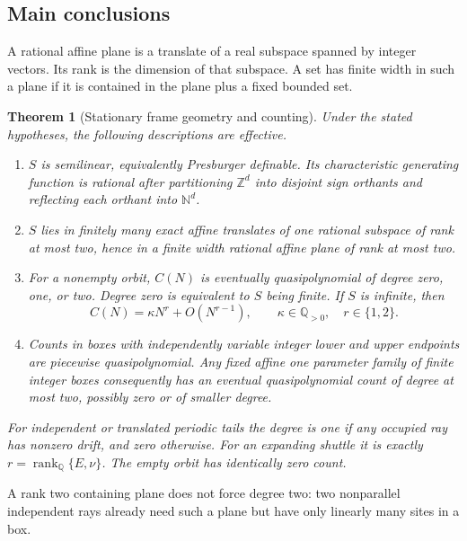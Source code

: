 \documentclass[11pt,letterpaper]{article}
\numberwithin{equation}{section}
\newtheorem{theorem}{Theorem}[section]
\theoremstyle{definition}
\theoremstyle{remark}
\newcommand{\Z}{\mathbb Z}
\newcommand{\Q}{\mathbb Q}
\newcommand{\rank}{\operatorname{rank}}
\newcommand{\NN}{\mathbb N}
\begin{document}
\subsection{Main conclusions}
A rational affine plane is a translate of a real subspace spanned by integer vectors. Its rank is the dimension of that subspace. A set has finite width in such a plane if it is contained in the plane plus a fixed bounded set.

\begin{theorem}[Stationary frame geometry and counting]\label{smc:og:thm:geometry}
Under the stated hypotheses, the following descriptions are effective.
\begin{enumerate}
\item $S$ is semilinear, equivalently Presburger definable. Its characteristic generating function is rational after partitioning $\Z^d$ into disjoint sign orthants and reflecting each orthant into $\NN^d$.
\item $S$ lies in finitely many exact affine translates of one rational subspace of rank at most two, hence in a finite width rational affine plane of rank at most two.
\item For a nonempty orbit, $C(N)$ is eventually quasipolynomial of degree zero, one, or two. Degree zero is equivalent to $S$ being finite. If $S$ is infinite, then
\begin{equation}\label{smc:og:eq:Cgeneral}
 C(N)=\kappa N^r+O(N^{r-1}),\qquad \kappa\in\Q_{>0},\quad r\in\{1,2\}.
\end{equation}
\item Counts in boxes with independently variable integer lower and upper endpoints are piecewise quasipolynomial. Any fixed affine one parameter family of finite integer boxes consequently has an eventual quasipolynomial count of degree at most two, possibly zero or of smaller degree.
\end{enumerate}
For independent or translated periodic tails the degree is one if any occupied ray has nonzero drift, and zero otherwise. For an expanding shuttle it is exactly $r=\rank_\Q\{E,\nu\}$. The empty orbit has identically zero count.
\end{theorem}
A rank two containing plane does not force degree two: two nonparallel independent rays already need such a plane but have only linearly many sites in a box.
\end{document}

